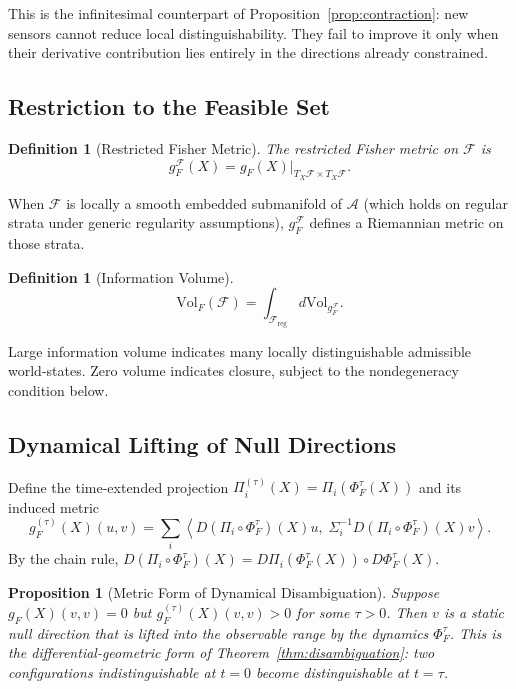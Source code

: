 \documentclass[12pt, oneside]{article}
\newtheorem{proposition}[theorem]{Proposition}
\newtheorem{definition}[theorem]{Definition}
\begin{document}
This is the infinitesimal counterpart of Proposition~\ref{prop:contraction}: new sensors
cannot reduce local distinguishability. They fail to improve it only when their derivative
contribution lies entirely in the directions already constrained.

\subsection{Restriction to the Feasible Set}

\begin{definition}[Restricted Fisher Metric]
The restricted Fisher metric on $\mathcal{F}$ is
\[
g_F^{\mathcal{F}}(X) = g_F(X)\big|_{T_X\mathcal{F} \times T_X\mathcal{F}}.
\]
\end{definition}

When $\mathcal{F}$ is locally a smooth embedded submanifold of $\mathcal{A}$ (which holds
on regular strata under generic regularity assumptions), $g_F^{\mathcal{F}}$ defines a
Riemannian metric on those strata.

\begin{definition}[Information Volume]
\[
\mathrm{Vol}_F(\mathcal{F}) = \int_{\mathcal{F}_{\mathrm{reg}}} d\mathrm{Vol}_{g_F^{\mathcal{F}}}.
\]
\end{definition}

Large information volume indicates many locally distinguishable admissible world-states.
Zero volume indicates closure, subject to the nondegeneracy condition below.

\subsection{Dynamical Lifting of Null Directions}

Define the time-extended projection $\Pi_i^{(\tau)}(X) = \Pi_i(\Phi_F^\tau(X))$ and its
induced metric
\[
g_F^{(\tau)}(X)(u,v)
= \sum_i \left\langle D(\Pi_i \circ \Phi_F^\tau)(X)u,\;
\Sigma_i^{-1} D(\Pi_i \circ \Phi_F^\tau)(X)v \right\rangle.
\]
By the chain rule, $D(\Pi_i \circ \Phi_F^\tau)(X) = D\Pi_i(\Phi_F^\tau(X)) \circ D\Phi_F^\tau(X)$.

\begin{proposition}[Metric Form of Dynamical Disambiguation]
\label{prop:dynamical_lifting}
Suppose $g_F(X)(v,v) = 0$ but $g_F^{(\tau)}(X)(v,v) > 0$ for some $\tau > 0$.
Then $v$ is a static null direction that is lifted into the observable range by the
dynamics $\Phi_F^\tau$. This is the differential-geometric form of
Theorem~\ref{thm:disambiguation}: two configurations indistinguishable at $t = 0$
become distinguishable at $t = \tau$.
\end{proposition}
\end{document}
